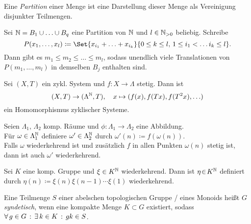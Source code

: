 \documentclass{cheat-sheet}
\begin{document}
\begin{defn}
  Eine \emph{Partition} einer Menge ist eine Darstellung dieser Menge als Vereinigung disjunkter Teilmengen.
\end{defn}

\begin{lem}
  Sei $\mathbb{N} = B_1 \cup \ldots \cup B_q$ eine Partition von $\mathbb{N}$ und $l \in \mathbb{N}_{>0}$ beliebig.
  Schreibe
  \[ P(x_1, \ldots, x_l) \coloneqq \Set{ x_{i_1} + \ldots + x_{i_k} }{0 \leq k \leq l, \, 1 \leq i_1 < \ldots i_k \leq l}. \]
  Dann gibt es $m_1 \leq m_2 \leq \ldots \leq m_l$, sodass unendlich viele Translationen von $P(m_1, \ldots, m_l)$ in demselben $B_j$ enthalten sind.
\end{lem}

\begin{bem}
  Sei $(X, T)$ ein zykl. System und $f : X \to \Lambda$ stetig. Dann ist
  \[
    (X, T) \to (\Lambda^{\mathbb{N}}, T), \quad
    x \mapsto (f(x), f(Tx), f(T^2x), \ldots)
  \]
  ein Homomorphismus zyklischer Systeme.

\end{bem}

\begin{thm}
  Seien $\Lambda_1$, $\Lambda_2$ komp. Räume und $\phi : \Lambda_1 \to \Lambda_2$ eine Abbildung. \\
  Für $\omega \in \Lambda_1^{\mathbb{N}}$ definiere $\omega' \in \Lambda_2^{\mathbb{N}}$ durch $\omega'(n) \coloneqq f(\omega(n))$. \\
  Falls $\omega$ wiederkehrend ist und zusätzlich $f$ in allen Punkten $\omega(n)$ stetig ist, dann ist auch $\omega'$ wiederkehrend.
\end{thm}


\begin{prop}
  Sei $K$ eine komp. Gruppe und $\xi \in K^{\mathbb{N}}$ wiederkehrend. Dann ist $\eta \!\in\! K^{\mathbb{N}}$ definiert durch $\eta(n) \coloneqq \xi(n) \xi(n-1) \cdots \xi(1)$ wiederkehrend.
\end{prop}



\begin{defn}
  Eine Teilmenge $S$ einer abelschen topologischen Gruppe / eines Monoids heißt $G$ \emph{syndetisch}, wenn eine kompakte Menge $K \subset G$ existiert, sodass $\forall \, {g \in G} \,:\, \exists \, {k \in K} \,:\, gk \in S$.
\end{defn}
\end{document}
